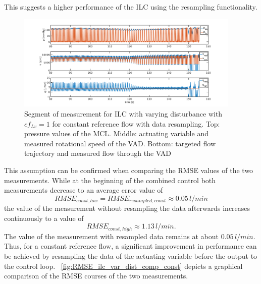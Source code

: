 \\This suggests a higher performance of the ILC using the resampling functionality.
\begin{figure}[ht!]
  \centering
  \includegraphics[width=0.95\textwidth]{images/chapt_5/ILC/ilc_var_dist_fix_const.pdf}
  \caption[Segment of measurement for ILC with varying disturbance with $cf_{Lv}=1$ for constant reference flow with data resampling]{Segment of measurement for ILC with varying disturbance with $cf_{Lv}=1$ for constant reference flow with data resampling. Top:  pressure values of the MCL. Middle: actuating variable and measured rotational speed of the VAD. Bottom: targeted flow trajectory and measured flow through the VAD}
  \label{fig:ilc_var_dist_fix_const}
\end{figure}
This assumption can be confirmed when comparing the RMSE values of the two measurements.
While at the beginning of the combined control both measurements decrease to an average error value of
\begin{equation}
  RMSE_{const,low}=RMSE_{resampled,const}\approx0.05\,l/min
\end{equation}
 the value of the measurement without resampling the data afterwards increases continuously to a value of
\begin{equation}
  RMSE_{const,high}\approx1.13\,l/min.
\end{equation}
The value of the measurement with resampled data remains at about $0.05\,l/min$. Thus, for a constant reference flow, a significant improvement in performance can be achieved by resampling the data of the actuating variable before the output to the control loop.
\figurename~\ref{fig:RMSE_ilc_var_dist_comp_const} depicts a graphical comparison of the RMSE courses of the two measurements.
